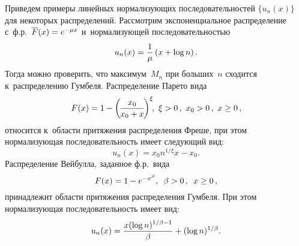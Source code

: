 \begin{multicols}{2}
Приведем примеры линейных нормализующих последовательностей  $\{u_n(x)\}$ для  
некоторых распределений.
Рассмотрим экспоненциальное распределение  с~ф.р.\
$\overline F(x) \hm= e^{-\mu x}$ и~нормализующей последовательностью
 \begin{equation}
 \label{expun}
 u_n(x) = \displaystyle\frac{\displaystyle 1\mathstrut}{\displaystyle \mu\mathstrut} \left(x + \log n\right).
 \end{equation}
Тогда можно проверить, что  максимум~$M_n$  при больших~$n$ сходится 
к~распределению Гумбеля. Распределение Парето вида
 \begin{equation}
 \label{pareto}
    F(x) = 1- \left ( \!\fr{x_0}{x_0+x}\! \right )^{\xi}\!\!, \ \xi>0\,, \  x_0 >0\,,\ 
x\ge 0\,,\!
\end{equation}
 относится к~области притяжения распределения
 Фреше, при этом нормализующая последовательность имеет сле\-ду\-ющий вид:
 \begin{equation}
 \label{un-pareto}
     u_n(x) = x_0n^{1/\xi} x - x_0.
 \end{equation}
 Распределение Вейбулла, заданное ф.р.\ вида
 \begin{equation}
\label{weibull}
F(x)=1-e^{-x^{\beta}}, \enskip \beta >0\,, \enskip x\ge  0\,,
\end{equation}
принадлежит  области притяжения распределения Гумбеля. При этом нор\-ма\-ли\-зу\-ющая 
последовательность  имеет вид:%
\begin{equation*}
 \label{weibull22}
 u_n(x) = \displaystyle\frac{\displaystyle x(\log n)^{1/\beta-1}\mathstrut}{\displaystyle \beta\mathstrut}  + (\log n)^{1/\beta}.
 \end{equation*}


\end{multicols}
